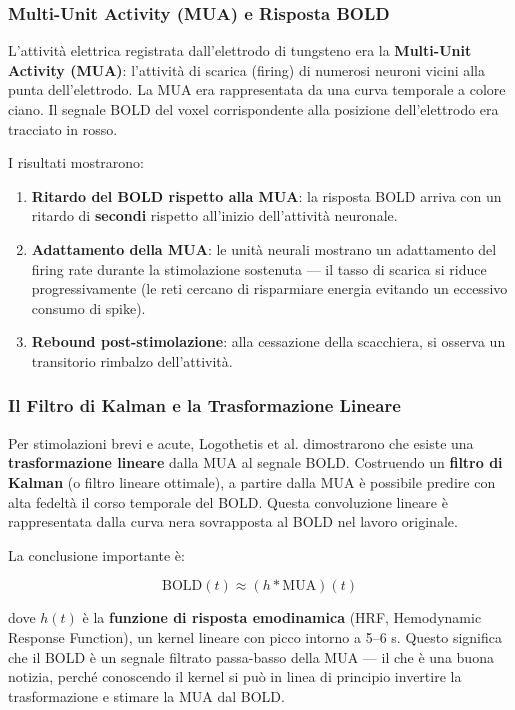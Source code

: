 \subsubsection{Multi-Unit Activity (MUA) e Risposta BOLD}

L'attività elettrica registrata dall'elettrodo di tungsteno era la \textbf{Multi-Unit Activity (MUA)}: l'attività di scarica (firing) di numerosi neuroni vicini alla punta dell'elettrodo. La MUA era rappresentata da una curva temporale a colore ciano. Il segnale BOLD del voxel corrispondente alla posizione dell'elettrodo era tracciato in rosso.

I risultati mostrarono:

\begin{enumerate}
    \item \textbf{Ritardo del BOLD rispetto alla MUA}: la risposta BOLD arriva con un ritardo di \textbf{secondi} rispetto all'inizio dell'attività neuronale.
    \item \textbf{Adattamento della MUA}: le unità neurali mostrano un adattamento del firing rate durante la stimolazione sostenuta — il tasso di scarica si riduce progressivamente (le reti cercano di risparmiare energia evitando un eccessivo consumo di spike).
    \item \textbf{Rebound post-stimolazione}: alla cessazione della scacchiera, si osserva un transitorio rimbalzo dell'attività.
\end{enumerate}

\subsubsection{Il Filtro di Kalman e la Trasformazione Lineare}

Per stimolazioni brevi e acute, Logothetis et al. dimostrarono che esiste una \textbf{trasformazione lineare} dalla MUA al segnale BOLD. Costruendo un \textbf{filtro di Kalman} (o filtro lineare ottimale), a partire dalla MUA è possibile predire con alta fedeltà il corso temporale del BOLD. Questa convoluzione lineare è rappresentata dalla curva nera sovrapposta al BOLD nel lavoro originale.

La conclusione importante è:

$$ \text{BOLD}(t) \approx (h * \text{MUA})(t) $$

dove $h(t)$ è la \textbf{funzione di risposta emodinamica} (HRF, Hemodynamic Response Function), un kernel lineare con picco intorno a 5–6 s. Questo significa che il BOLD è un segnale filtrato passa-basso della MUA — il che è una buona notizia, perché conoscendo il kernel si può in linea di principio invertire la trasformazione e stimare la MUA dal BOLD.

